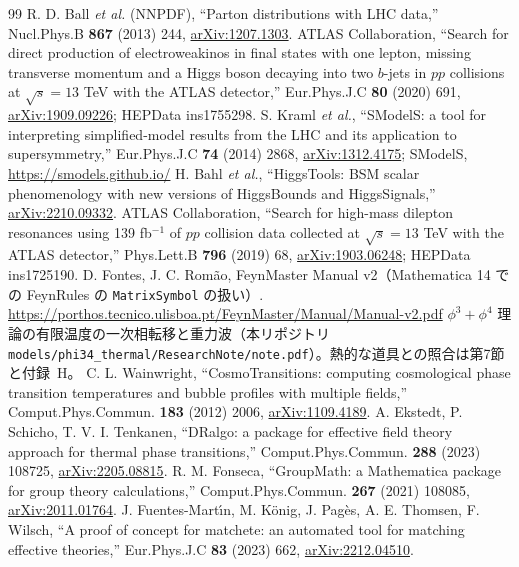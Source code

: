 \documentclass[a4paper,10pt]{ltjsarticle}
\begin{document}
\begin{thebibliography}{99}
 R. D. Ball \textit{et al.} (NNPDF), ``Parton distributions with LHC data,'' Nucl.Phys.B \textbf{867} (2013) 244, \href{https://arxiv.org/abs/1207.1303}{arXiv:1207.1303}.
 ATLAS Collaboration, ``Search for direct production of electroweakinos in final states with one lepton, missing transverse momentum and a Higgs boson decaying into two $b$-jets in $pp$ collisions at $\sqrt s=13$ TeV with the ATLAS detector,'' Eur.Phys.J.C \textbf{80} (2020) 691, \href{https://arxiv.org/abs/1909.09226}{arXiv:1909.09226}; HEPData ins1755298.
 S. Kraml \textit{et al.}, ``SModelS: a tool for interpreting simplified-model results from the LHC and its application to supersymmetry,'' Eur.Phys.J.C \textbf{74} (2014) 2868, \href{https://arxiv.org/abs/1312.4175}{arXiv:1312.4175}; SModelS, \url{https://smodels.github.io/}
 H. Bahl \textit{et al.}, ``HiggsTools: BSM scalar phenomenology with new versions of HiggsBounds and HiggsSignals,'' \href{https://arxiv.org/abs/2210.09332}{arXiv:2210.09332}.
 ATLAS Collaboration, ``Search for high-mass dilepton resonances using 139 fb$^{-1}$ of $pp$ collision data collected at $\sqrt s=13$ TeV with the ATLAS detector,'' Phys.Lett.B \textbf{796} (2019) 68, \href{https://arxiv.org/abs/1903.06248}{arXiv:1903.06248}; HEPData ins1725190.
 D. Fontes, J. C. Rom\~ao, FeynMaster Manual v2（Mathematica 14 での FeynRules の \texttt{MatrixSymbol} の扱い）. \url{https://porthos.tecnico.ulisboa.pt/FeynMaster/Manual/Manual-v2.pdf}
 $\phi^3+\phi^4$ 理論の有限温度の一次相転移と重力波（本リポジトリ \nolinkurl{models/phi34_thermal/ResearchNote/note.pdf}）。熱的な道具との照合は第7節と付録~H。
 C. L. Wainwright, ``CosmoTransitions: computing cosmological phase transition temperatures and bubble profiles with multiple fields,'' Comput.Phys.Commun. \textbf{183} (2012) 2006, \href{https://arxiv.org/abs/1109.4189}{arXiv:1109.4189}.
 A. Ekstedt, P. Schicho, T. V. I. Tenkanen, ``DRalgo: a package for effective field theory approach for thermal phase transitions,'' Comput.Phys.Commun. \textbf{288} (2023) 108725, \href{https://arxiv.org/abs/2205.08815}{arXiv:2205.08815}.
 R. M. Fonseca, ``GroupMath: a Mathematica package for group theory calculations,'' Comput.Phys.Commun. \textbf{267} (2021) 108085, \href{https://arxiv.org/abs/2011.01764}{arXiv:2011.01764}.
 J. Fuentes-Mart\'{\i}n, M. K\"onig, J. Pag\`es, A. E. Thomsen, F. Wilsch, ``A proof of concept for matchete: an automated tool for matching effective theories,'' Eur.Phys.J.C \textbf{83} (2023) 662, \href{https://arxiv.org/abs/2212.04510}{arXiv:2212.04510}.

\end{thebibliography}
\end{document}
